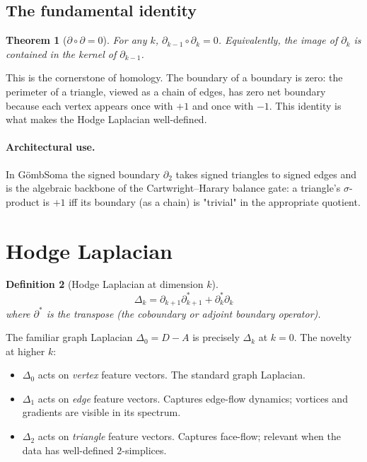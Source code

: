 \documentclass[11pt,a4paper]{article}
\newtheorem{theorem}{Theorem}[section]
\newtheorem{definition}[theorem]{Definition}
\newcommand{\sig}{\ensuremath{\sigma}}
\begin{document}
\subsection{The fundamental identity}

\begin{theorem}[$\partial \circ \partial = 0$]
For any $k$, $\partial_{k-1} \circ \partial_k = 0$. Equivalently, the
image of $\partial_k$ is contained in the kernel of $\partial_{k-1}$.
\end{theorem}

This is the cornerstone of homology. The boundary of a boundary is
zero: the perimeter of a triangle, viewed as a chain of edges, has
zero net boundary because each vertex appears once with $+1$ and once
with $-1$. This identity is what makes the Hodge Laplacian well-defined.

\paragraph{Architectural use.} In G\"ombSoma the signed boundary
$\partial_2$ takes signed triangles to signed edges and is the
algebraic backbone of the Cartwright--Harary balance gate: a
triangle's $\sig$-product is $+1$ iff its boundary (as a chain) is
"trivial" in the appropriate quotient.

\section{Hodge Laplacian}

\begin{definition}[Hodge Laplacian at dimension $k$]
\[
\Delta_k = \partial_{k+1} \partial_{k+1}^* + \partial_k^* \partial_k
\]
where $\partial^*$ is the transpose (the \emph{coboundary} or
\emph{adjoint boundary} operator).
\end{definition}

The familiar graph Laplacian $\Delta_0 = D - A$ is precisely $\Delta_k$
at $k = 0$. The novelty at higher $k$:

\begin{itemize}
\item $\Delta_0$ acts on \emph{vertex} feature vectors. The standard
  graph Laplacian.
\item $\Delta_1$ acts on \emph{edge} feature vectors. Captures edge-flow
  dynamics; vortices and gradients are visible in its spectrum.
\item $\Delta_2$ acts on \emph{triangle} feature vectors. Captures
  face-flow; relevant when the data has well-defined $2$-simplices.
\end{itemize}
\end{document}
